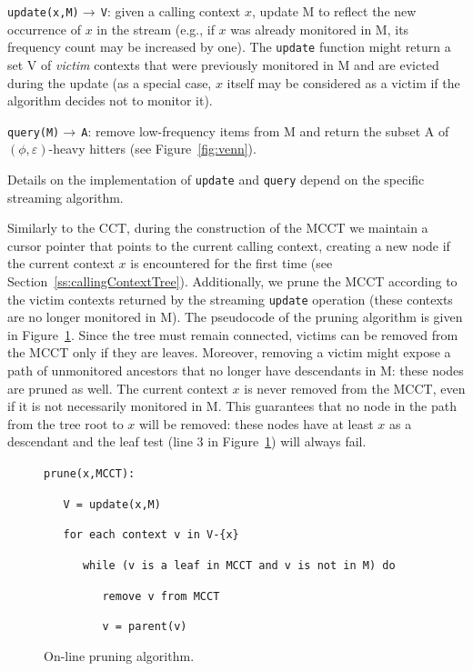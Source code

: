 \documentclass[preprint]{sigplanconf}
\begin{document}
\begin{description}

 \item {\tt update(x,M)}$\rightarrow\,${\tt V}: given a calling context $x$, update M to reflect the new occurrence of $x$ in the stream (e.g., if $x$ was already monitored in M, its frequency count may be increased by one). The {\tt update} function might return a set V of {\em victim} contexts that were previously monitored in M and are evicted during the update (as a special case, $x$ itself may be considered as a victim if the algorithm decides not to monitor it).

\item {\tt query(M)}$\rightarrow\,${\tt A}: remove low-frequency items from M and return the subset A of $(\phi,\varepsilon)$-heavy hitters (see Figure~\ref{fig:venn}).
\end{description}

\noindent Details on the implementation of {\tt update} and {\tt query} depend on the specific streaming algorithm. 

Similarly to the CCT, during the construction of the MCCT we maintain a cursor pointer that points to the current calling context, creating a new node if the current context $x$ is encountered for the first time (see Section~\ref{ss:callingContextTree}). Additionally, we prune the MCCT according to the victim contexts returned by the streaming {\tt update} operation (these contexts are no longer monitored in M). The pseudocode of the pruning algorithm is given in Figure~\ref{fig:update}. Since the tree must remain connected, victims can be removed from the MCCT only if they are leaves. Moreover, removing a victim might expose a path of unmonitored ancestors that no longer have descendants in M: these nodes are pruned as well. The current context $x$ is never removed from the MCCT, even if it is not necessarily monitored in M. This guarantees that no node in the path from the tree root to $x$ will be removed: these nodes have at least $x$ as a descendant and the leaf test (line 3 in Figure~\ref{fig:update}) will always fail.

\begin{figure}[t]
\begin{small}
\verb|prune(x,MCCT):|

\verb|   V = update(x,M)|

\verb|   for each context v in V-{x}|

\verb|      while (v is a leaf in MCCT and v is not in M) do|

\verb|         remove v from MCCT|

\verb|         v = parent(v)|
\end{small}
\caption{On-line pruning algorithm.}
\label{fig:update}
\end{figure} 
\end{document}
